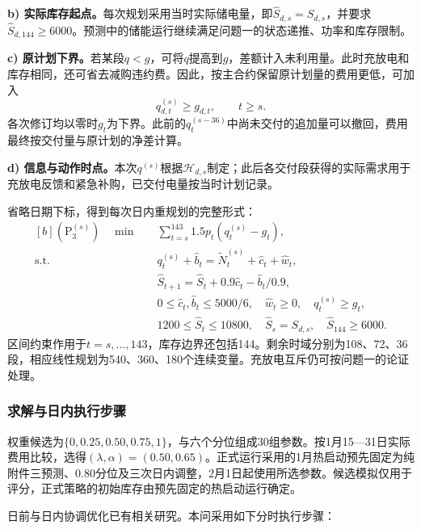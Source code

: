 \textbf{b) 实际库存起点。}每次规划采用当时实际储电量，即$\widehat S_{d,s}=S_{d,s}$，并要求$\widehat S_{d,144}\ge6000$。预测中的储能运行继续满足问题一的状态递推、功率和库存限制。

\textbf{c) 原计划下界。}若某段$q<g$，可将$q$提高到$g$，差额计入未利用量。此时充放电和库存相同，还可省去减购违约费。因此，按主合约保留原计划量的费用更低，可加入
\begin{equation}
 q^{(s)}_{d,t}\ge g_{d,t},\qquad t\ge s.\label{eq:plan-floor}
\end{equation}
各次修订均以零时$g_t$为下界。此前的$q^{(s-36)}_t$中尚未交付的追加量可以撤回，费用最终按交付量与原计划的净差计算。

\textbf{d) 信息与动作时点。}本次$q^{(s)}$根据$\mathcal H_{d,s}$制定；此后各交付段获得的实际需求用于充放电反馈和紧急补购，已交付电量按当时计划记录。

省略日期下标，得到每次日内重规划的完整形式：
\begin{equation}
\begin{aligned}[b]
 (\mathrm P_3^{(s)})\quad\min\quad&
       \sum_{t=s}^{143}1.5p_t(q^{(s)}_t-g_t),\\
 \mathrm{s.t.}\quad&q^{(s)}_t+\widehat b_t
      =\widetilde N^{(s)}_t+\widehat c_t+\widehat w_t,\\
 &\widehat S_{t+1}=\widehat S_t+0.9\widehat c_t-\widehat b_t/0.9,\\
 &0\le\widehat c_t,\widehat b_t\le5000/6,\quad\widehat w_t\ge0,\quad q^{(s)}_t\ge g_t,\\
 &1200\le\widehat S_t\le10800,\quad
   \widehat S_s=S_{d,s},\quad\widehat S_{144}\ge6000.
\end{aligned}\label{eq:q3-summary}
\end{equation}
区间约束作用于$t=s,\ldots,143$，库存边界还包括144。剩余时域分别为108、72、36段，相应线性规划为540、360、180个连续变量。充放电互斥仍可按问题一的论证处理。

\subsubsection{求解与日内执行步骤}
权重候选为$\{0,0.25,0.50,0.75,1\}$，与六个分位组成30组参数。按1月15—31日实际费用比较，选得$(\lambda,\alpha)=(0.50,0.65)$。正式运行采用的1月热启动预先固定为纯附件三预测、0.80分位及三次日内调整，2月1日起使用所选参数。候选模拟仅用于评分，正式策略的初始库存由预先固定的热启动运行确定。

日前与日内协调优化已有相关研究。本问采用如下分时执行步骤：

